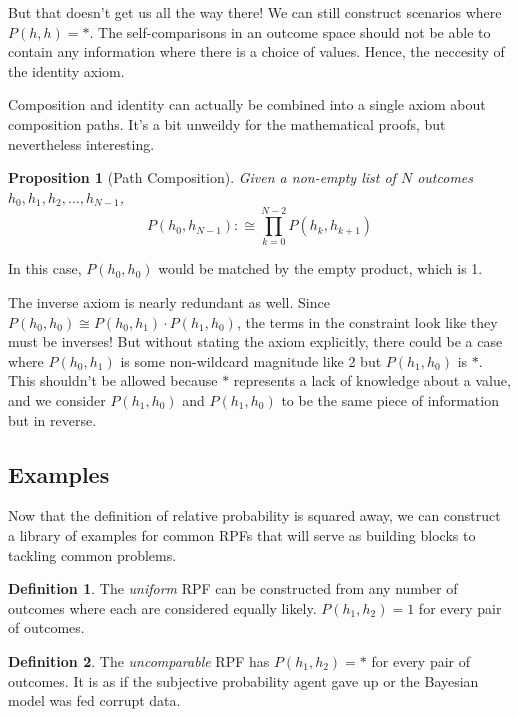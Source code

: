 \documentclass[twoside]{article}
\theoremstyle{plain}%
\newtheorem{proposition}[theorem]{Proposition}
\theoremstyle{definition}
\newtheorem{definition}{Definition}[section]
\theoremstyle{remark}
\begin{document}
But that doesn't get us all the way there! We can still construct scenarios where \(P(h, h) = \ast\). The self-comparisons in an outcome space should not be able to contain any information where there is a choice of values. Hence, the neccesity of the identity axiom.

Composition and identity can actually be combined into a single axiom about composition paths. It's a bit unweildy for the mathematical proofs, but nevertheless interesting.

\begin{proposition}[Path Composition]
Given a non-empty list of \(N\) outcomes \(h_0, h_1, h_2, ..., h_{N-1}\), \[P(h_0, h_{N-1}) :\cong \prod_{k=0}^{N-2} P(h_k, h_{k+1}) \]
\end{proposition}

In this case, \(P(h_0, h_0)\) would be matched by the empty product, which is 1.

The inverse axiom is nearly redundant as well. Since \(P(h_0, h_0) \cong P(h_0, h_1) \cdot P(h_1, h_0)\), the terms in the constraint look like they must be inverses! But without stating the axiom explicitly, there could be a case where \(P(h_0, h_1)\) is some non-wildcard magnitude like 2 but \(P(h_1, h_0)\) is \(\ast\). This shouldn't be allowed because \(\ast\) represents a lack of knowledge about a value, and we consider \(P(h_1, h_0)\) and \(P(h_1, h_0)\) to be the same piece of information but in reverse.

\subsection{Examples}

Now that the definition of relative probability is squared away, we can construct a library of examples for common RPFs that will serve as building blocks to tackling common problems.

\begin{definition}
\label{def:uniform_rpf}
The \textit{uniform} RPF can be constructed from any number of outcomes where each are considered equally likely. \(P(h_1, h_2) = 1\) for every pair of outcomes.
\end{definition}

\begin{definition}
\label{def:uncomparable_rpf}
The \textit{uncomparable} RPF has \(P(h_1, h_2) = \ast\) for every pair of outcomes. It is as if the subjective probability agent gave up or the Bayesian model was fed corrupt data.
\end{definition}
\end{document}
